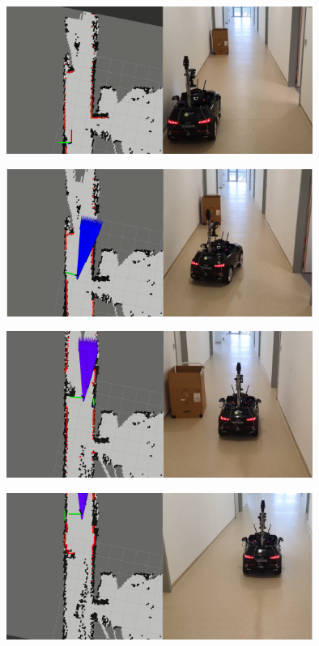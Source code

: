 \begin{minipage}{\textwidth}
	\centering
	\includegraphics[width=0.75\textwidth]{figures/raw/local_planner_real_test_joined_straight_traj_1_static_obj_1.png}
	
	\vspace{0.5cm}
	\centering
	\includegraphics[width=0.75\textwidth]{figures/raw/local_planner_real_test_joined_straight_traj_1_static_obj_2.png}
	
	\vspace{0.5cm}
	\centering
	\includegraphics[width=0.75\textwidth]{figures/raw/local_planner_real_test_joined_straight_traj_1_static_obj_3.png}
	
	\vspace{0.5cm}
	\centering
	\includegraphics[width=0.75\textwidth]{figures/raw/local_planner_real_test_joined_straight_traj_1_static_obj_4.png}
	
	\label{local_planner_real_test_joined_straight_traj_1_static_obj}
\end{minipage}